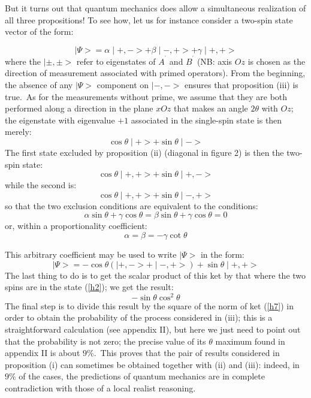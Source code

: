 \documentclass[12pt,onecolumn]{article}%
\begin{document}
But it turns out that quantum mechanics does allow a simultaneous realization
of all three propositions! To see how, let us for instance consider a two-spin
state vector of the form:%

\begin{equation}
\mid\Psi>=\alpha\mid+,->+\beta\mid-,+>+\gamma\mid+,+> \label{h1}%
\end{equation}
where the $\mid\pm,\pm>$ refer to eigenstates of $A^{^{\prime}}$ and
$B^{^{\prime}}$ (NB: axis $Oz$ is chosen as the direction of measurement
associated with primed operators). From the beginning, the absence of any
$\mid\Psi>$ component on $\mid-,->$ ensures that proposition (iii) is
true.\ As for the measurements without prime, we assume that they are both
performed along a direction in the plane $xOz$ that makes an angle $2\theta$
with $Oz$; the eigenstate with eigenvalue $+1$ associated in the single-spin
state is then merely:
\begin{equation}
\cos\theta\mid+>+\sin\theta\mid-> \label{h2}%
\end{equation}
The first state excluded by proposition (ii) (diagonal in figure 2) is then
the two-spin state:
\begin{equation}
\cos\theta\mid+,+>+\sin\theta\mid+,-> \label{h3}%
\end{equation}
while the second is:
\begin{equation}
\cos\theta\mid+,+>+\sin\theta\mid-,+> \label{h4}%
\end{equation}
so that the two exclusion conditions are equivalent to the conditions:
\begin{equation}
\alpha\sin\theta+\gamma\cos\theta=\beta\sin\theta+\gamma\cos\theta=0
\label{h5}%
\end{equation}
or, within a proportionality coefficient:
\begin{equation}
\alpha=\beta=-\gamma\cot\theta\label{h6}%
\end{equation}


This arbitrary coefficient may be used to write $\mid\Psi>$ in the form:
\begin{equation}
\mid\Psi>=-\cos\theta\left(  \mid+,->+\mid-,+>\right)  +\sin\theta\mid+,+>
\label{h7}%
\end{equation}
The last thing to do is to get the scalar product of this ket by that where
the two spins are in the state (\ref{h2}); we get the result:
\begin{equation}
-\sin\theta\cos^{2}\theta\label{h8}%
\end{equation}
The final step is to divide this result by the square of the norm of ket
(\ref{h7}) in order to obtain the probability of the process considered in
(iii); this is a straightforward calculation (see appendix II), but here we
just need to point out that the probability is not zero; the precise value of
its $\theta$ maximum found in appendix II is about $9\%$.\ This proves that
the pair of results considered in proposition (i) can sometimes be obtained
together with (ii) and (iii): indeed, in $9\%$ of the cases, the predictions
of quantum mechanics are in complete contradiction with those of a local
realist reasoning.
\end{document}
